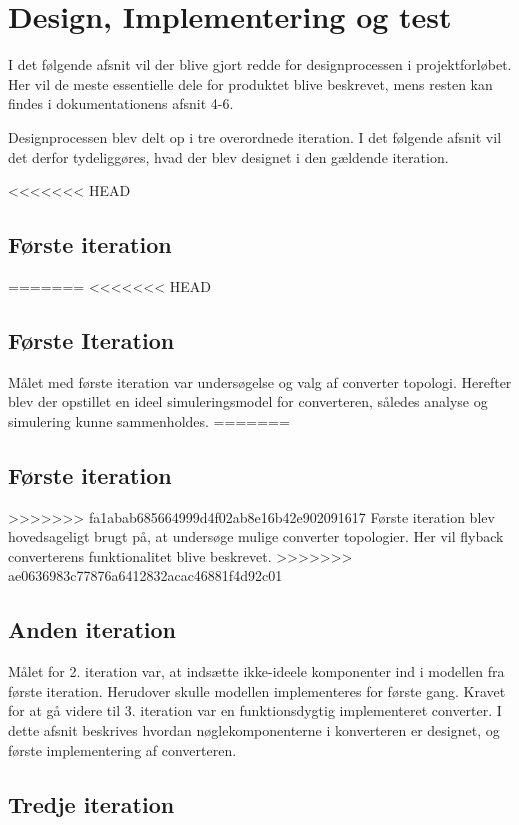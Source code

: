 \chapter{Design, Implementering og test}
I det følgende afsnit vil der blive gjort redde for designprocessen i projektforløbet. Her vil de meste essentielle dele for produktet blive beskrevet, mens resten kan findes i dokumentationens afsnit 4-6.

Designprocessen blev delt op i tre overordnede iteration. I det følgende afsnit vil det derfor tydeliggøres, hvad der blev designet i den gældende iteration. 

<<<<<<< HEAD
\section{Første iteration} 
=======
<<<<<<< HEAD
\section{Første Iteration}
Målet med første iteration var undersøgelse og valg af converter topologi. Herefter blev der opstillet en ideel simuleringsmodel for converteren, således analyse og simulering kunne sammenholdes. 
=======
\section{Første iteration}
>>>>>>> fa1abab685664999d4f02ab8e16b42e902091617
Første iteration blev hovedsageligt brugt på, at undersøge mulige converter topologier. Her vil flyback converterens funktionalitet blive beskrevet. 
>>>>>>> ae0636983c77876a6412832acac46881f4d92c01




\section{Anden iteration}
Målet for 2. iteration var, at indsætte ikke-ideele komponenter ind i modellen fra første iteration. Herudover skulle modellen implementeres for første gang. 
Kravet for at gå videre til 3. iteration var en funktionsdygtig implementeret converter. 
I dette afsnit beskrives hvordan nøglekomponenterne i konverteren er designet, og første implementering af converteren.





\section{Tredje iteration}







	
	
